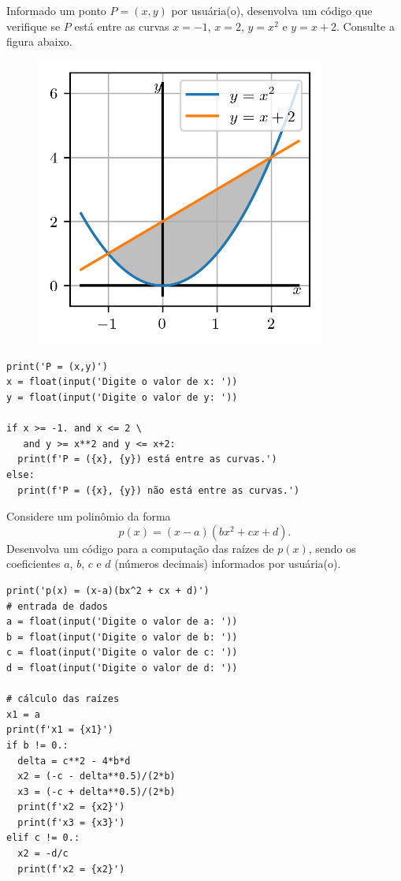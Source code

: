 \begin{exer}\label{cap_progest_sec_ramifica:exer:entre_curvas}
  Informado um ponto $P = (x, y)$ por usuária(o), desenvolva um código que verifique se $P$ está entre as curvas $x = -1$, $x = 2$, $y = x^2$ e $y = x+2$. Consulte a figura abaixo.
\begin{figure}[H]
  \centering
  \includegraphics[width=3.75in]{./cap_progest/dados/fig_exer_entre_curvas/fig.png}
\end{figure}
\end{exer}
\begin{resp}

\begin{lstlisting}
print('P = (x,y)')
x = float(input('Digite o valor de x: '))
y = float(input('Digite o valor de y: '))

if x >= -1. and x <= 2 \
   and y >= x**2 and y <= x+2:
  print(f'P = ({x}, {y}) está entre as curvas.')
else:
  print(f'P = ({x}, {y}) não está entre as curvas.')
\end{lstlisting}

\end{resp}

\begin{exer}
  Considere um polinômio da forma
  \begin{equation}
    p(x) = (x-a)(bx^2 + cx + d).
  \end{equation}
  Desenvolva um código para a computação das raízes de $p(x)$, sendo os coeficientes $a$, $b$, $c$ e $d$ (números decimais) informados por usuária(o).
\end{exer}
\begin{resp}

\begin{lstlisting}
print('p(x) = (x-a)(bx^2 + cx + d)')
# entrada de dados
a = float(input('Digite o valor de a: '))
b = float(input('Digite o valor de b: '))
c = float(input('Digite o valor de c: '))
d = float(input('Digite o valor de d: '))

# cálculo das raízes
x1 = a
print(f'x1 = {x1}')
if b != 0.:
  delta = c**2 - 4*b*d
  x2 = (-c - delta**0.5)/(2*b)
  x3 = (-c + delta**0.5)/(2*b)
  print(f'x2 = {x2}')
  print(f'x3 = {x3}')
elif c != 0.:
  x2 = -d/c
  print(f'x2 = {x2}')
\end{lstlisting}

\end{resp}

